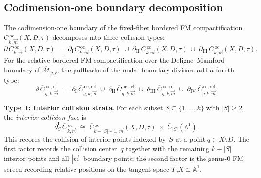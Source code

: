 \subsection{Codimension-one boundary decomposition}
\label{subsec:boundary-decomposition}

\begin{proposition}
\label{prop:four-type-boundary}
The codimension-one boundary of the fixed-fiber bordered FM
compactification
$\overline{C}{}^{\,\mathrm{oc}}_{k,\vec{m}}(X, D, \tau)$
decomposes into three collision types:
\begin{equation}\label{eq:boundary-three-types-fixed}
\partial\,\overline{C}{}^{\,\mathrm{oc}}_{k,\vec{m}}(X,D,\tau)
\;=\;
\partial_{\mathrm{I}}\,
\overline{C}{}^{\,\mathrm{oc}}_{k,\vec{m}}(X,D,\tau)
\;\cup\;
\partial_{\mathrm{II}}\,
\overline{C}{}^{\,\mathrm{oc}}_{k,\vec{m}}(X,D,\tau)
\;\cup\;
\partial_{\mathrm{III}}\,
\overline{C}{}^{\,\mathrm{oc}}_{k,\vec{m}}(X,D,\tau).
\end{equation}
For the relative bordered FM compactification over the
Deligne--Mumford boundary of $\overline{\mathcal M}_{g,r}$, the
pullbacks of the nodal boundary divisors add a fourth type:
\begin{equation}\label{eq:boundary-four-types}
\partial\,\overline{C}{}^{\,\mathrm{oc,rel}}_{g;k,\vec{m}}
\;=\;
\partial_{\mathrm{I}}\,
\overline{C}{}^{\,\mathrm{oc,rel}}_{g;k,\vec{m}}
\;\cup\;
\partial_{\mathrm{II}}\,
\overline{C}{}^{\,\mathrm{oc,rel}}_{g;k,\vec{m}}
\;\cup\;
\partial_{\mathrm{III}}\,
\overline{C}{}^{\,\mathrm{oc,rel}}_{g;k,\vec{m}}
\;\cup\;
\partial_{\mathrm{IV}}\,
\overline{C}{}^{\,\mathrm{oc,rel}}_{g;k,\vec{m}}.
\end{equation}

\medskip
\noindent\textbf{Type~I: Interior collision strata.}
For each subset $S \subseteq \{1, \ldots, k\}$ with
$|S| \geq 2$, the \emph{interior collision face} is
\begin{equation}\label{eq:typeI-stratum}
\partial_S^{\mathrm{I}}\,
\overline{C}{}^{\,\mathrm{oc}}_{k,\vec{m}}
\;\cong\;
\overline{C}{}^{\,\mathrm{oc}}_{k-|S|+1,\, \vec{m}}
(X, D, \tau)
\;\times\;
\overline{C}_{|S|}(\mathbb{A}^1).
\end{equation}
This records the collision of interior points indexed by~$S$
at a point $q \in X \setminus D$. The first factor records the
collision center~$q$ together with the remaining $k - |S|$
interior points and all $|\vec{m}|$ boundary points; the second
factor is the genus-$0$ FM screen recording relative positions on
the tangent space $T_q X \cong \mathbb{A}^1$.


\end{proposition}
